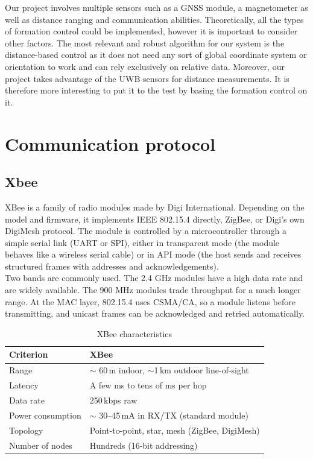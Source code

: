 Our project involves multiple sensors such as a GNSS module, a magnetometer as well as distance ranging  and communication abilities. Theoretically, all the types of formation control could be implemented, however it is important to consider other factors. The most relevant and robust algorithm for our system is the distance-based control as it does not need any sort of global coordinate system or orientation to work and can rely exclusively on relative data. Moreover, our project takes advantage of the UWB sensors for distance measurements. It is therefore more interesting to put it to the test by basing the formation control on it. 

\newpage
\section{Communication protocol}
 
\subsection{Xbee}

XBee is a family of radio modules made by Digi International. Depending on the model and firmware, it implements IEEE 802.15.4 \cite{noauthor_ieee_nodate} directly, ZigBee, or Digi’s own DigiMesh protocol. The module is controlled by a microcontroller through a simple serial link (UART or SPI), either in transparent mode (the module behaves like a wireless serial cable) or in API mode (the host sends and receives structured frames with addresses and acknowledgements). \\

\noindent Two bands are commonly used. The 2.4 GHz modules have a high data rate and are widely available. The 900 MHz modules trade throughput for a much longer range. At the MAC layer, 802.15.4 \cite{noauthor_ieee_nodate} uses CSMA/CA, so a module listens before transmitting, and unicast frames can be acknowledged and retried automatically.

\begin{table}[H]
\centering

\label{tab:xbee}
\begin{tabular}{@{}p{3.7cm}p{10cm}@{}}
\toprule
\textbf{Criterion} & \textbf{XBee} \\
\midrule
Range & $\sim$ 60\,m indoor, $\sim$1\,km outdoor line-of-sight  \\
Latency & A few ms to tens of ms per hop  \\
Data rate & 250\,kbps raw  \\
Power consumption & $\sim$ 30--45\,mA in RX/TX (standard module)\\
Topology & Point-to-point, star, mesh (ZigBee, DigiMesh) \\
Number of nodes & Hundreds (16-bit addressing)\\

\bottomrule
\end{tabular}
\caption{XBee characteristics}
\end{table}


